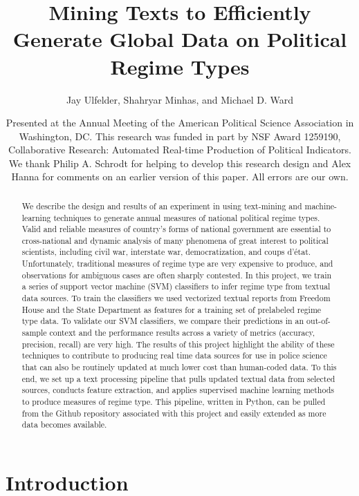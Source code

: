 \documentclass[pdftex,12pt,fullpage,oneside]{amsart}
\title{Mining Texts to Efficiently Generate Global Data on Political Regime Types}
\author{Jay Ulfelder, Shahryar Minhas, and Michael D. Ward}
\date{Presented at the Annual Meeting of the American Political Science Association in Washington, DC. This research was funded in part by NSF Award 1259190, Collaborative Research: Automated Real-time Production of Political Indicators. We thank Philip A. Schrodt for helping to develop this research design and Alex Hanna for comments on an earlier version of this paper. All errors are our own.}
\begin{document}
\maketitle

\singlespacing
\begin{abstract}
We describe the design and results of an experiment in using text-mining and machine-learning techniques to generate annual measures of national political regime types. Valid and reliable measures of country's forms of national government are essential to cross-national and dynamic analysis of many phenomena of great interest to political scientists, including civil war, interstate war, democratization, and coups d'\'{e}tat. Unfortunately, traditional measures of regime type are very expensive to produce, and observations for ambiguous cases are often sharply contested. In this project, we train a series of support vector machine (SVM) classifiers to infer regime type from textual data sources. To train the classifiers we used vectorized textual reports from Freedom House and the State Department as features for a training set of prelabeled regime type data. To validate our SVM classifiers, we compare their predictions in an out-of-sample context and the performance results across a variety of metrics (accuracy, precision, recall) are very high. The results of this project highlight the ability of these techniques to contribute to producing real time data sources for use in police science that can also be routinely updated at much lower cost than human-coded data. To this end, we set up a text processing pipeline that pulls updated textual data from selected sources, conducts feature extraction, and applies supervised machine learning methods to produce measures of regime type. This pipeline, written in Python, can be pulled from the Github repository associated with this project and easily extended as more data becomes available.
\end{abstract} 

\newpage
\newpage\setcounter{page}{1} 
\doublespacing

\section{Introduction}
\end{document}

